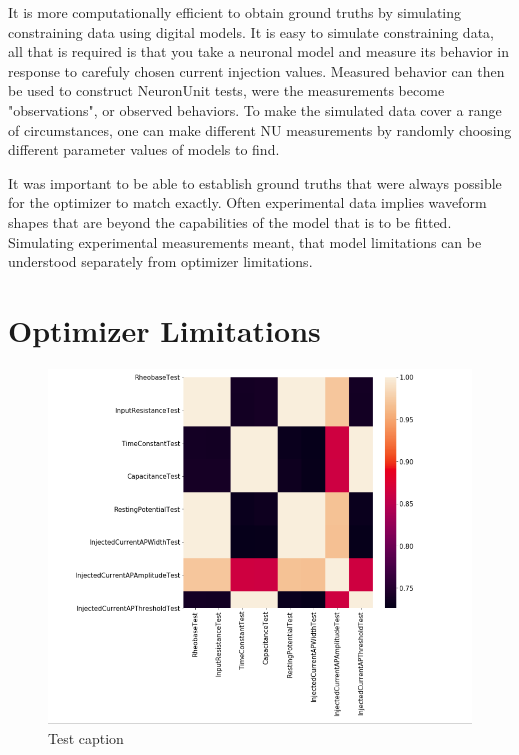 It is more computationally efficient to obtain ground truths by simulating constraining data using digital models. It is easy to simulate constraining data, all that is required is that you take a neuronal model and measure its behavior in response to carefuly chosen current injection values. Measured behavior can then be used to construct NeuronUnit tests, were the measurements become "observations", or observed behaviors. To make the simulated data cover a range of circumstances, one can make different NU measurements by randomly choosing different parameter values of models to find.

It was important to be able to establish ground truths that were always possible for the optimizer to match exactly. Often experimental data implies waveform shapes that are beyond the capabilities of the model that is to be fitted. Simulating experimental measurements meant, that model limitations can be understood separately from optimizer limitations.

\section{Optimizer Limitations}


\begin{center}
    \begin{figure}
    
        \includegraphics[width=\linewidth]{figures/correlated_errors.png}
    
    	\caption{Test caption}
    \end{figure}
\end{center}